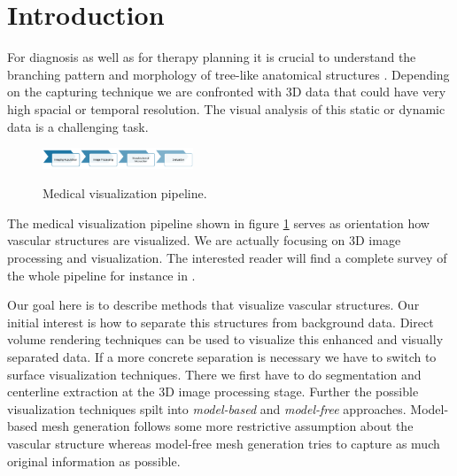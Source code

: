 \section{Introduction}


For diagnosis as well as for therapy planning it is crucial to understand the branching pattern and morphology of tree-like anatomical structures \cite{preim2013visual}.
Depending on the capturing technique we are confronted with 3D data that could have very high spacial or temporal resolution. The visual analysis of this static or dynamic data is a challenging task.

\begin{figure}[h]
	\centering
	\includegraphics[width=0.4\textwidth]{./Images/MedicalVisualizationPipeline.png} \\
	\caption{Medical visualization pipeline.}
	\label{fig:MedicalVisualizationPipeline}
\end{figure}

The medical visualization pipeline shown in figure \ref{fig:MedicalVisualizationPipeline} serves as orientation how vascular structures are visualized. We are actually focusing on 3D image processing and visualization. The interested reader will find a complete survey of the whole pipeline for instance in \cite{preim2013visual}. 

Our goal here is to describe methods that visualize vascular structures. Our initial interest is how to separate this structures from background data. Direct volume rendering techniques can be used to visualize this enhanced and visually separated data. If a more concrete separation is necessary we have to switch to surface visualization techniques.
There we first have to do segmentation and centerline extraction at the 3D image processing stage. Further the possible visualization techniques spilt into \emph{model-based} and \emph{model-free} approaches. 
Model-based mesh generation follows some more restrictive assumption about the vascular structure whereas model-free mesh generation tries to capture as much original information as possible.



